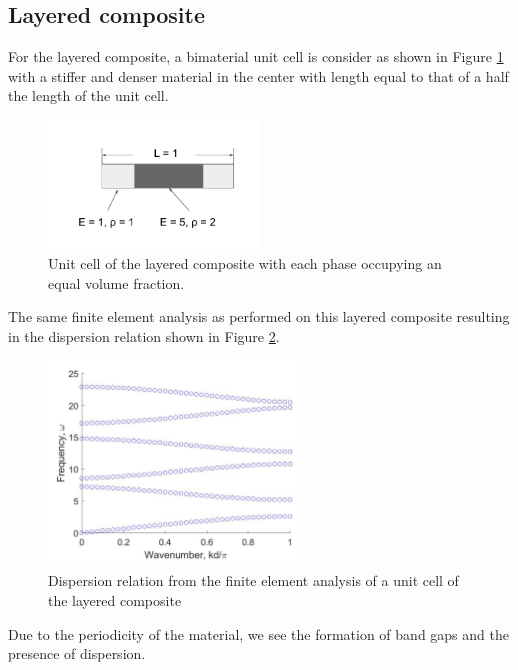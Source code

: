 \documentclass{article}
\begin{document}
\subsection{Layered composite}
For the layered composite, a bimaterial unit cell is consider as shown in 
Figure \ref{fig:layrdcell} with a stiffer and denser material in the center 
with length equal to that of a half the length of the unit cell. 
\begin{figure}[!htbp]
	\centering
	\includegraphics[width=0.5\textwidth]{layrd-unit-cell.pdf}
	\caption{Unit cell of the layered composite with each phase occupying an 
	equal volume fraction.}
	\label{fig:layrdcell}
\end{figure}
The same finite element analysis as performed on this layered composite 
resulting in the dispersion relation shown in Figure \ref{fig:layrd}.
\begin{figure}[!htbp]
	\centering
	\includegraphics[width=0.6\textwidth]{layrd.pdf}
	\caption{Dispersion relation from the finite element analysis of a unit 
	cell of the layered composite}
	\label{fig:layrd}
\end{figure}
Due to the periodicity of the material, we see the formation of band gaps and 
the presence of dispersion. 

\end{document}
